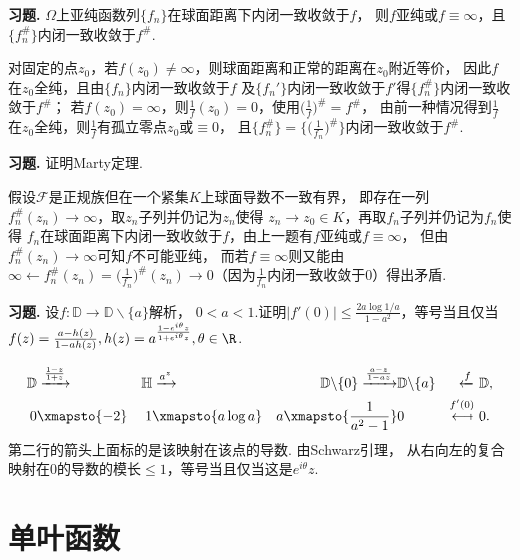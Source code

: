 \textbf{习题. } $\Omega$上亚纯函数列$\{f_n\}$在球面距离下内闭一致收敛于$f$，
则$f$亚纯或$f\equiv\infty$，且$\{f_n^\#\}$内闭一致收敛于$f^\#$.

\begin{proofc}
    对固定的点$z_0$，若$f(z_0)\neq\infty$，则球面距离和正常的距离在$z_0$附近等价，
    因此$f$在$z_0$全纯，且由$\{f_n\}$内闭一致收敛于$f$
    及$\{f_n'\}$内闭一致收敛于$f'$得$\{f_n^\#\}$内闭一致收敛于$f^\#$；
    若$f(z_0)=\infty$，则$\frac{1}{f}(z_0)=0$，使用$\big(\frac{1}{f}\big)^\#=f^\#$，
    由前一种情况得到$\frac{1}{f}$在$z_0$全纯，则$\frac{1}{f}$有孤立零点$z_0$或$\equiv0$，
    且$\{f_n^\#\}=\{\big(\frac{1}{f_n}\big)^\#\}$内闭一致收敛于$f^\#$.
\end{proofc}

\textbf{习题. } 证明Marty定理.

\begin{proofc}
    假设$\mathscr{F}$是正规族但在一个紧集$K$上球面导数不一致有界，
    即存在一列$f_n^\#(z_n)\rightarrow\infty$，取$z_n$子列并仍记为$z_n$使得
    $z_n\rightarrow z_0\in K$，再取$f_n$子列并仍记为$f_n$使得
    $f_n$在球面距离下内闭一致收敛于$f$，由上一题有$f$亚纯或$f\equiv\infty$，
    但由$f_n^\#(z_n)\rightarrow\infty$可知$f$不可能亚纯，
    而若$f\equiv\infty$则又能由$\infty\leftarrow f_n^\#(z_n)=\big(\frac{1}{f_n}\big)^\#(z_n)
    \rightarrow0$（因为$\frac{1}{f_n}$内闭一致收敛于$0$）得出矛盾.
\end{proofc}

\textbf{习题. } 设$f\colon\mathbb{D}\rightarrow\mathbb{D}\backslash\{a\}$解析，
$0<a<1$.证明$|f'(0)|\leq\frac{2a\log 1/a}{1-a^2}$，等号当且仅当
$f(z)=\frac{a-h(z)}{1-ah(z)},
h(z)=a^\frac{1-e^{i\theta}z}{1+e^{i\theta}z},\theta\in\R$.

\begin{proofc}
    \begin{align*}
        \mathbb{D}&\xrightarrow{\frac{1-z}{1+z}}&\mathbb{H}&
        \xrightarrow{a^z}&\mathbb{D}\backslash\{0\}
        \xrightarrow{\frac{a-z}{1-az}}&\mathbb{D}\backslash\{a\}&
        \xleftarrow{f}&\ \mathbb{D},\\
        0&\xmapsto{-2}&1&\xmapsto{a\log a}&a\xmapsto{\frac{1}{a^2-1}}&
        0&\stackrel{f'(0)}{\mapsfrom}&\ 0.
    \end{align*}
    第二行的箭头上面标的是该映射在该点的导数. 由Schwarz引理，
    从右向左的复合映射在$0$的导数的模长$\leq1$，等号当且仅当这是$e^{i\theta}z$.
\end{proofc}

\section{单叶函数}

